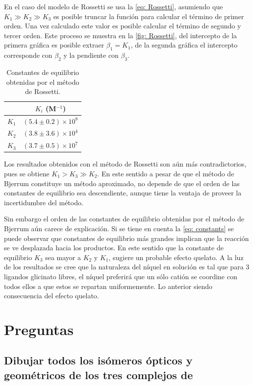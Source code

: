 \documentclass[fleqn,10pt]{SelfArx} %
\begin{document}
	En el caso del modelo de Rossetti se usa la \autoref{eq: Rossetti}, asumiendo que $K_1 \gg K_2 \gg K_3$ es posible truncar la funci\'on para calcular el t\'ermino de primer orden. Una vez calculado este valor es posible calcular el t\'ermino de segundo y tercer orden. Este proceso se muestra en la \autoref{fig: Rossetti}, del intercepto de la primera gr\'afica es posible extraer $\beta_1 = K_1$, de la segunda gr\'afica el intercepto corresponde con $\beta_2$ y la pendiente con $\beta_3$.
	\begin{table}[h]
		\centering
		\caption{Constantes de equilibrio obtenidas por el m\'etodo de Rossetti.}
		\begin{tabular}{cc}
			\hline
			& $K_i$ (M$^{-1}$) \\
			\hline
			$K_1$ & $(5.4\pm 0.2)\times10^{8}$ \\
			$K_2$ & $(3.8\pm 3.6)\times10^{4}$ \\
			$K_3$ & $(3.7\pm 0.5)\times10^{7}$ \\
			\hline
		\end{tabular}
		\label{tb: Rossetti}
	\end{table}
	
	Los resultados obtenidos con el m\'etodo de Rossetti son a\'un m\'as contradictorios, pues se obtiene $K_1 > K_3 \gg K_2$. En este sentido a pesar de que el m\'etodo de Bjerrum constituye un m\'etodo aproximado, no depende de que el orden de las constantes de equilibrio sea descendiente, aunque tiene la ventaja de proveer la incertidumbre del m\'etodo. 
	
	Sin embargo el orden de las constantes de equilibrio obtenidas por el m\'etodo de Bjerrum a\'un carece de explicaci\'on. Si se tiene en cuenta la \autoref{eq: constants} se puede observar que constantes de equilibrio m\'as grandes implican que la reacci\'on se ve desplazada hacia los productos. En este sentido que la constante de equilibrio $K_3$ sea mayor a $K_2$ y $K_1$, sugiere un probable efecto quelato. A la luz de los resultados se cree que la naturaleza del n\'iquel en soluci\'on es tal que para 3 ligandos glicinato libres, el n\'iquel preferir\'a que un s\'olo cati\'on se coordine con todos ellos a que estos se repartan uniformemente. Lo anterior siendo consecuencia del efecto quelato.

	\section{Preguntas}
	\subsection{Dibujar todos los is\'omeros \'opticos y geom\'etricos de los tres complejos de}
\end{document}
